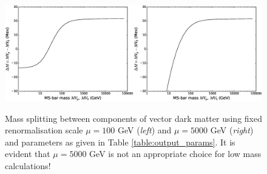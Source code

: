 \documentclass[11pt]{article}
\begin{document}
\begin{figure}[h]
\includegraphics[width=0.5\textwidth]{mass_splittings.eps}\includegraphics[width=0.5\textwidth]{mass_splittings_5k.eps}\\
\caption{Mass splitting between components of vector dark matter using fixed renormalisation scale $\mu=100$ GeV (\textit{left}) and $\mu=5000$ GeV (\textit{right}) and parameters as given in Table \ref{table:output_params}.  It is evident that $\mu=5000$ GeV is not an appropriate choice for low mass calculations!} \label{fig:mass_splittings}
\end{figure}



{}

\end{document}
